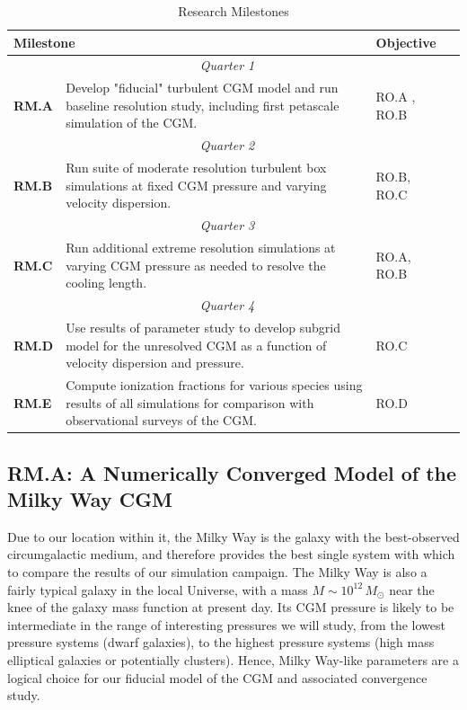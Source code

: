 \documentclass[11pt,letterpaper,english]{article}
\begin{document}
\begin{table}[h]
\caption{Research Milestones}
\label{table:RM}
\begin{tabular}{|l|p{4.7in}|p{0.9in}|l|} 
\hline
\multicolumn{2}{|l|}{\bf Milestone} & {\bf Objective} \\ \hline
\multicolumn{3}{|c|}{\it Quarter 1} \\ \hline
\textbf{RM.A} & Develop "fiducial" turbulent CGM model and run baseline resolution study, including first petascale simulation of the CGM. & RO.A , RO.B \\ \hline
\multicolumn{3}{|c|}{\it Quarter 2} \\ \hline
\textbf{RM.B} & Run suite of moderate resolution turbulent box simulations at fixed CGM pressure and varying velocity dispersion. & RO.B, RO.C\\ \hline
\multicolumn{3}{|c|}{\it Quarter 3} \\ \hline
\textbf{RM.C} & Run additional extreme resolution simulations at varying CGM pressure as needed to resolve the cooling length. & RO.A, RO.B \\ \hline
\multicolumn{3}{|c|}{\it Quarter 4} \\ \hline
\textbf{RM.D} & Use results of parameter study to develop subgrid model for the unresolved CGM as a function of velocity dispersion and pressure. & RO.C \\ \hline
\textbf{RM.E} & Compute ionization fractions for various species using results of all simulations for comparison with observational surveys of the CGM. & RO.D \\ \hline
\end{tabular}
\end{table}

\vspace{-.25in}
\subsection{RM.A: A Numerically Converged Model of the Milky Way CGM}
\vspace{-.2in}

Due to our location within it, the Milky Way is the galaxy with the best-observed circumgalactic medium, and therefore provides the best single system with which to compare the results of our simulation campaign. The Milky Way is also a fairly typical galaxy in the local Universe, with a mass $M \sim 10^{12}\,M_\odot$ near the knee of the galaxy mass function at present day. Its CGM pressure is likely to be intermediate in the range of interesting pressures we will study, from the lowest pressure systems (dwarf galaxies), to the highest pressure systems (high mass elliptical galaxies or potentially clusters). Hence, Milky Way-like parameters are a logical choice for our fiducial model of the CGM and associated convergence study.
\end{document}
